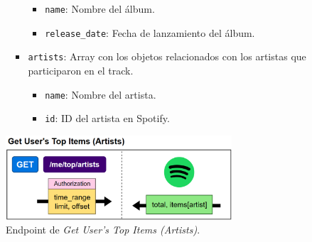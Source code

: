 \begin{itemize}
\begin{itemize}
\begin{itemize}
\begin{itemize}
                                  \item \texttt{name}: Nombre del álbum.
                                  \item \texttt{release\_date}: Fecha de lanzamiento del álbum.
                              \end{itemize}
                        \item \texttt{artists}: Array con los objetos relacionados con los artistas que participaron en el track.
                              \begin{itemize}
                                  \item \texttt{name}: Nombre del artista.
                                  \item \texttt{id}: ID del artista en Spotify.
                              \end{itemize}
                    \end{itemize}
          \end{itemize}
\end{itemize}

\begin{figure}[H]
    \centering
    \includegraphics[width=0.75\textwidth]{figures/endpoints/get_users_top_items_artists.png}
    \caption{Endpoint de \textit{Get User's Top Items (Artists)}.}
    \label{fig:get_usr_top_items_artists}
\end{figure}

